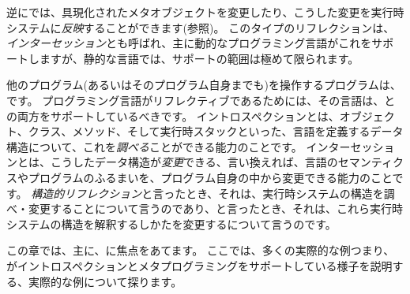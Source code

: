 \documentclass[a4paper,10pt,twoside]{book}
\begin{document}
逆に\st{}では、具現化されたメタオブジェクトを変更したり、こうした変更を実行時システムに\emph{反映}することができます(参照)。
このタイプのリフレクションは、\emph{インターセッション}とも呼ばれ、主に動的なプログラミング言語がこれをサポートしますが、静的な言語では、サポートの範囲は極めて限られます。

他のプログラム(あるいはそのプログラム自身までも)を操作するプログラムは、です。
プログラミング言語がリフレクティブであるためには、その言語は、との両方をサポートしているべきです。
イントロスペクションとは、オブジェクト、クラス、メソッド、そして実行時スタックといった、言語を定義するデータ構造について、これを\emph{調べる}ことができる能力のことです。
インターセッションとは、こうしたデータ構造が\emph{変更}できる、言い換えれば、言語のセマンティクスやプログラムのふるまいを、プログラム自身の中から変更できる能力のことです。
\emph{構造的リフレクション}と言ったとき、それは、実行時システムの構造を調べ・変更することについて言うのであり、と言ったとき、それは、これら実行時システムの構造を解釈するしかたを変更するについて言うのです。

この章では、主に、に焦点をあてます。
ここでは、多くの実際的な例つまり、\st{}がイントロスペクションとメタプログラミングをサポートしている様子を説明する、実際的な例について探ります。
\end{document}
